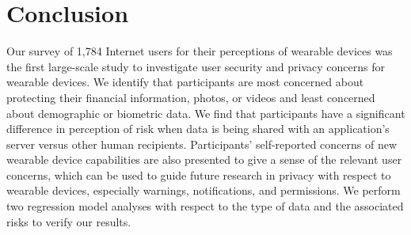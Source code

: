 
\section{Conclusion}

Our survey of 1,784 Internet users for their perceptions of wearable devices was the first large-scale study to investigate user security and privacy concerns for wearable devices. We identify that participants are most concerned about protecting their financial information, photos, or videos and least concerned about demographic or biometric data. We find that participants have a significant difference in perception of risk when data is being shared with an application's server versus other human recipients. Participants' self-reported concerns of new wearable device capabilities are also presented to give a sense of the relevant user concerns, which can be used to guide future research in privacy with respect to wearable devices, especially warnings, notifications, and permissions. We perform two regression model analyses with respect to the type of data and the associated risks to verify our results.



